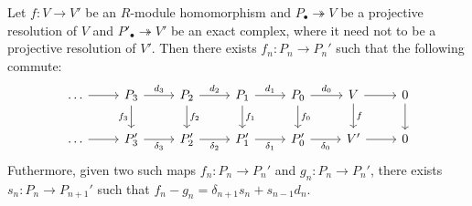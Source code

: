 \begin{pro} 
    Let $f:V\to V'$ be an $R$-module homomorphism and $P_\bullet\twoheadrightarrow V$ be a projective resolution of $V$ and $P'_\bullet \twoheadrightarrow V'$ be an exact complex, where it need not to be a projective resolution of $V'$. Then there exists $f_n:P_n\to P_n'$ such that the following commute:
    \[\begin{tikzcd}[sep=small]
	{\dots } && {P_3} && {P_2} && {P_1} && {P_0} && V && 0 \\
	\\
	\dots && {P_3'} && {P'_2} && {P'_1} && {P'_0} && {V'} && 0
	\arrow[from=1-1, to=1-3]
	\arrow["{d_3}", from=1-3, to=1-5]
	\arrow["{f_3}"', from=1-3, to=3-3]
	\arrow["{d_2}", from=1-5, to=1-7]
	\arrow["{f_2}", from=1-5, to=3-5]
	\arrow["{d_1}", from=1-7, to=1-9]
	\arrow["{f_1}", from=1-7, to=3-7]
	\arrow["{d_0}", from=1-9, to=1-11]
	\arrow["{f_0}", from=1-9, to=3-9]
	\arrow[from=1-11, to=1-13]
	\arrow["f", from=1-11, to=3-11]
	\arrow[from=1-13, to=3-13]
	\arrow[from=3-1, to=3-3]
	\arrow["{\delta_3}"', from=3-3, to=3-5]
	\arrow["{\delta_2}"', from=3-5, to=3-7]
	\arrow["{\delta_1}"', from=3-7, to=3-9]
	\arrow["{\delta_0}"', from=3-9, to=3-11]
	\arrow[from=3-11, to=3-13]
\end{tikzcd}\]
    Futhermore, given two such maps $f_n:P_n \to P_n'$ and $g_n:P_n\to P_n'$, there exists $s_n:P_n \to P_{n+1}'$ such that $f_n-g_n=\delta_{n+1}s_n + s_{n-1}d_n$.
\end{pro}
